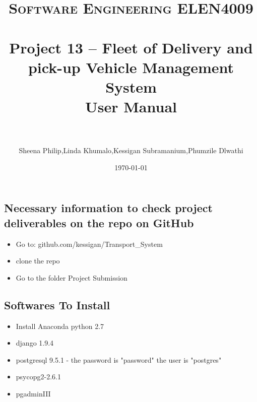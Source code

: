 \documentclass[paper=a4, fontsize=11pt]{scrartcl} %
\title{	
\normalfont \normalsize 
\textsc{Software Engineering ELEN4009} \\ [25pt] %
\horrule{0.5pt} \\[0.4cm] %
\huge Project 13 -- Fleet of Delivery and pick-up Vehicle Management System \\ %
\huge User Manual \\ %
\horrule{2pt} \\[0.5cm] %
}
\author{Sheena Philip,Linda Khumalo,Kessigan Subramanium,Phumzile Dlwathi} %
\date{\normalsize\today} %
\numberwithin{equation}{section} %
\numberwithin{figure}{section} %
\numberwithin{table}{section} %
\begin{document}
\maketitle %




\subsection{Necessary information to check project deliverables on the repo on GitHub}
\begin{itemize}
\item Go to: github.com/kessigan/Transport\_System
\item clone the repo
\item Go to the folder Project Submission
\end{itemize}

\subsection{Softwares To Install}
\begin{itemize}
\item  Install Anaconda python 2.7
\item django 1.9.4
\item postgresql 9.5.1 - the password is "password" the user is "postgres"
\item psycopg2-2.6.1
\item pgadminIII

\end{itemize}
\end{document}
